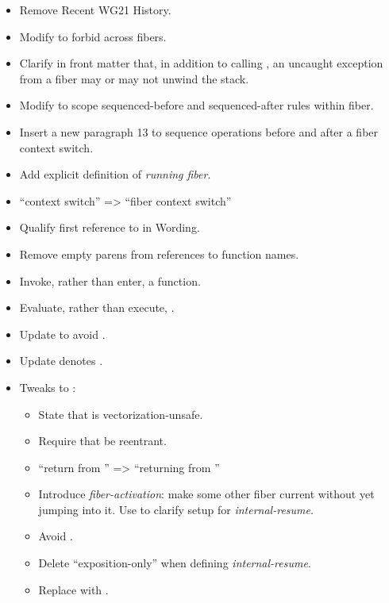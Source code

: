 \begin{itemize}
    \item Remove Recent WG21 History.
    \item Modify  to forbid  across fibers.
    \item Clarify in front matter that, in addition to calling \termn, an
          uncaught exception from a fiber may or may not unwind the stack.
    \item Modify  to scope sequenced-before and
          sequenced-after rules within fiber.
    \item Insert a new  paragraph 13 to sequence
          operations before and after a fiber context switch.
    \item Add explicit definition of \emph{running fiber}.
    \item ``context switch'' => ``fiber context switch''
    \item Qualify first reference to \stdfiber in Wording.
    \item Remove empty parens from references to function names.
    \item Invoke, rather than enter, a function.
    \item Evaluate, rather than execute, .
    \item Update \mandates to avoid .
    \item Update \mandates {}\add{\cpp{\&\&}} denotes \fiber\add{\cpp{\&\&}}.
    \item Tweaks to \resumewith:
    \begin{itemize}
        \item State that \resumewith is vectorization-unsafe.
        \item Require that \resumewith be reentrant.
        \item ``return from \resumewith'' => ``returning from \resumewith''
        \item Introduce \emph{fiber-activation}: make some other fiber
              current without yet jumping into it. Use to clarify setup
              for \emph{internal-resume}.
        \item Avoid .
        \item Delete ``exposition-only'' when defining \emph{internal-resume}.
        \item Replace  with .

\end{itemize}
\end{itemize}
